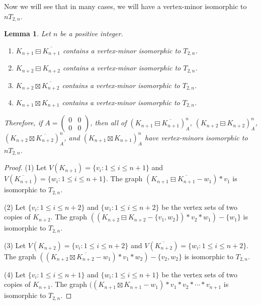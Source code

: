 \documentclass[11pt]{article}
\newtheorem{lemma}[theorem]{Lemma}
\newcommand\mat{\boxminus}
\newcommand\antimat{\boxtimes}
\def\K_#1{{K_{#1}}}
\def\S_#1{\overline{K_{#1}}}
\begin{document}
Now we will see that in many cases, we will have a vertex-minor
isomorphic to  $nT_{2,n}$.
\begin{lemma}\label{lem:obtainnt2}
  Let $n$ be a positive integer.
  \begin{enumerate}[(1)]
  \item $\K_{n+1}\mat\S_{n+1}$ contains a vertex-minor isomorphic to $T_{2,n}$.
  \item $\K_{n+2}\mat\K_{n+2}$ contains a vertex-minor isomorphic to $T_{2,n}$.
  \item $\K_{n+2}\antimat\S_{n+2}$ contains a vertex-minor isomorphic to $T_{2,n}$.
  \item $\K_{n+1}\antimat\K_{n+1}$ contains a vertex-minor isomorphic to $T_{2,n}$.
  \end{enumerate}
  Therefore, if $A=(
  \begin{smallmatrix}
    0 & 0\\
    0 & 0
  \end{smallmatrix})$, then 
  all of $(\K_{n+1}\mat \S_{n+1})^n_A$,
  $(\K_{n+2}\mat \K_{n+2})^n_A$,
  $(\K_{n+2}\antimat \S_{n+2})^n_A$,
  and 
  $(\K_{n+1}\antimat \K_{n+1})^n_A$
  have vertex-minors isomorphic to $nT_{2,n}$.
  
\end{lemma}
\begin{proof}
 (1) Let $V(\K_{n+1})=\{v_i:1\le i\le n+1\}$ and $V(\S_{n+1})=\{w_i:1\le i\le n+1\}$.
	The graph $(\K_{n+1}\mat\S_{n+1}-w_1)*v_1$ is isomorphic to $T_{2,n}$.
     
    (2) Let $\{v_i:1\le i\le n+2\}$ and $\{w_i:1\le i\le n+2\}$ be the vertex sets of two copies of $\K_{n+2}$. 
    The graph $((\K_{n+2}\mat\K_{n+2}-\{v_1, w_2\})*v_2*w_1)-\{w_1\}$ is isomorphic to $T_{2,n}$.

  (3) Let $V(\K_{n+2})=\{v_i:1\le i\le n+2\}$ and $V(\S_{n+2})=\{w_i:1\le i\le n+2\}$.
	The graph $((\K_{n+2}\antimat\S_{n+2}-w_1)*v_1*w_2)-\{v_2, w_2\}$ is isomorphic to $T_{2,n}$.

 (4) Let $\{v_i:1\le i\le n+1\}$ and $\{w_i:1\le i\le n+1\}$ be the vertex sets of two copies of $\K_{n+1}$. 
    The graph $((\K_{n+1}\antimat\K_{n+1}-w_1)*v_1*v_2*\cdots *v_{n+1}$ is isomorphic to $T_{2,n}$.
  \end{proof}
\end{document}
